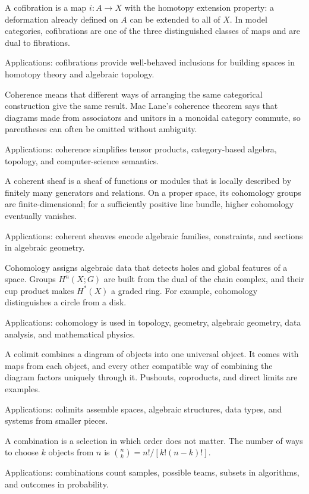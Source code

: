A cofibration is a map $i:A\to X$ with the homotopy extension property: a deformation already defined on $A$ can be extended to all of $X$. In model categories, cofibrations are one of the three distinguished classes of maps and are dual to fibrations. \par\noindent Applications: cofibrations provide well-behaved inclusions for building spaces in homotopy theory and algebraic topology.

Coherence means that different ways of arranging the same categorical construction give the same result. Mac Lane's coherence theorem says that diagrams made from associators and unitors in a monoidal category commute, so parentheses can often be omitted without ambiguity. \par\noindent Applications: coherence simplifies tensor products, category-based algebra, topology, and computer-science semantics.

A coherent sheaf is a sheaf of functions or modules that is locally described by finitely many generators and relations. On a proper space, its cohomology groups are finite-dimensional; for a sufficiently positive line bundle, higher cohomology eventually vanishes. \par\noindent Applications: coherent sheaves encode algebraic families, constraints, and sections in algebraic geometry.

Cohomology assigns algebraic data that detects holes and global features of a space. Groups $H^n(X;G)$ are built from the dual of the chain complex, and their cup product makes $H^*(X)$ a graded ring. For example, cohomology distinguishes a circle from a disk. \par\noindent Applications: cohomology is used in topology, geometry, algebraic geometry, data analysis, and mathematical physics.

A colimit combines a diagram of objects into one universal object. It comes with maps from each object, and every other compatible way of combining the diagram factors uniquely through it. Pushouts, coproducts, and direct limits are examples. \par\noindent Applications: colimits assemble spaces, algebraic structures, data types, and systems from smaller pieces.

A combination is a selection in which order does not matter. The number of ways to choose $k$ objects from $n$ is $\binom nk=n!/[k!(n-k)!]$. \par\noindent Applications: combinations count samples, possible teams, subsets in algorithms, and outcomes in probability.

